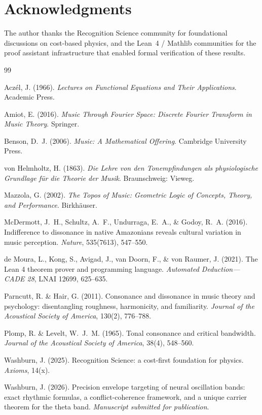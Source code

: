 \documentclass[11pt,a4paper]{article}
\begin{document}
\section*{Acknowledgments}

The author thanks the Recognition Science community for foundational
discussions on cost-based physics, and the Lean~4 / Mathlib communities
for the proof assistant infrastructure that enabled formal verification
of these results.

\begin{thebibliography}{99}

Acz{\'e}l, J. (1966).
\textit{Lectures on Functional Equations and Their Applications}.
Academic Press.

Amiot, E. (2016).
\textit{Music Through Fourier Space: Discrete Fourier Transform in
Music Theory}. Springer.

Benson, D.~J. (2006).
\textit{Music: A Mathematical Offering}. Cambridge University Press.

von Helmholtz, H. (1863).
\textit{Die Lehre von den Tonempfindungen als physiologische Grundlage
f\"ur die Theorie der Musik}. Braunschweig: Vieweg.

Mazzola, G. (2002).
\textit{The Topos of Music: Geometric Logic of Concepts, Theory, and
Performance}. Birkh\"auser.

McDermott, J.~H., Schultz, A.~F., Undurraga, E.~A., \& Godoy, R.~A.
(2016).
Indifference to dissonance in native Amazonians reveals cultural
variation in music perception.
\textit{Nature}, 535(7613), 547--550.

de Moura, L., Kong, S., Avigad, J., van Doorn, F., \& von Raumer, J.
(2021).
The Lean 4 theorem prover and programming language.
\textit{Automated Deduction---CADE 28}, LNAI 12699, 625--635.

Parncutt, R. \& Hair, G. (2011).
Consonance and dissonance in music theory and psychology: disentangling
roughness, harmonicity, and familiarity.
\textit{Journal of the Acoustical Society of America}, 130(2), 776--788.

Plomp, R. \& Levelt, W.~J.~M. (1965).
Tonal consonance and critical bandwidth.
\textit{Journal of the Acoustical Society of America}, 38(4), 548--560.

Washburn, J. (2025).
Recognition Science: a cost-first foundation for physics.
\textit{Axioms}, 14(x).

Washburn, J. (2026).
Precision envelope targeting of neural oscillation bands: exact
rhythmic formulas, a conflict-coherence framework, and a unique carrier
theorem for the theta band.
\textit{Manuscript submitted for publication}.

\end{thebibliography}
\end{document}
